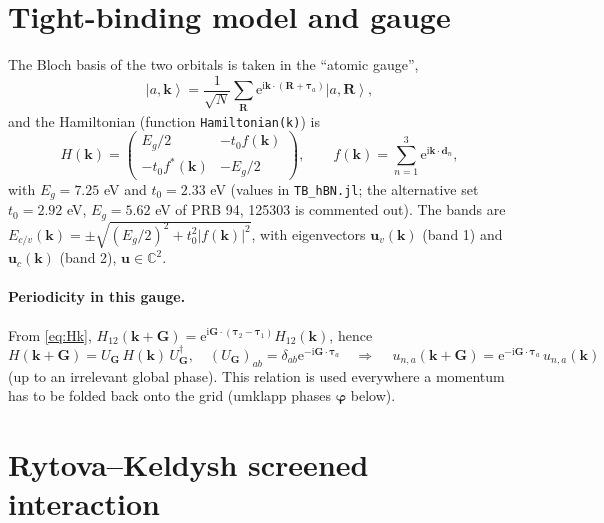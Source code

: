 \documentclass[11pt,a4paper]{article}
\newcommand{\ii}{\mathrm{i}}
\newcommand{\ee}{\mathrm{e}}
\newcommand{\kk}{\bm{k}}
\newcommand{\GG}{\bm{G}}
\newcommand{\RR}{\bm{R}}
\newcommand{\dd}{\bm{d}}
\newcommand{\ttau}{\bm{\tau}}
\newcommand{\ket}[1]{\left|#1\right\rangle}
\newcommand{\code}[1]{\texttt{#1}}
\begin{document}
\section{Tight-binding model and gauge}
\label{sec:tb}

The Bloch basis of the two orbitals is taken in the ``atomic gauge'',
\begin{equation}
\ket{a,\kk}=\frac{1}{\sqrt N}\sum_{\RR}\ee^{\ii\kk\cdot(\RR+\ttau_a)}\ket{a,\RR},
\end{equation}
and the Hamiltonian (function \code{Hamiltonian(k)}) is
\begin{equation}
H(\kk)=\begin{pmatrix}E_g/2 & -t_0 f(\kk)\\ -t_0 f^*(\kk) & -E_g/2\end{pmatrix},\qquad
f(\kk)=\sum_{n=1}^{3}\ee^{\ii\kk\cdot\dd_n},
\label{eq:Hk}
\end{equation}
with $E_g=7.25$ eV and $t_0=2.33$ eV (values in \code{TB\_hBN.jl}; the alternative set $t_0=2.92$ eV, $E_g=5.62$ eV of PRB 94, 125303 is commented out). The bands are $E_{c/v}(\kk)=\pm\sqrt{(E_g/2)^2+t_0^2|f(\kk)|^2}$, with eigenvectors
$\bm u_v(\kk)$ (band 1) and $\bm u_c(\kk)$ (band 2), $\bm u\in\mathbb C^2$.

\paragraph{Periodicity in this gauge.} From \eqref{eq:Hk}, $H_{12}(\kk+\GG)=\ee^{\ii\GG\cdot(\ttau_2-\ttau_1)}H_{12}(\kk)$, hence
\begin{equation}
H(\kk+\GG)=U_{\GG}\,H(\kk)\,U_{\GG}^\dagger,\quad (U_{\GG})_{ab}=\delta_{ab}\ee^{-\ii\GG\cdot\ttau_a}
\quad\Longrightarrow\quad
\boxed{\,u_{n,a}(\kk+\GG)=\ee^{-\ii\GG\cdot\ttau_a}\,u_{n,a}(\kk)\,}
\label{eq:gaugeG}
\end{equation}
(up to an irrelevant global phase). This relation is used everywhere a momentum has to be folded back onto the grid (umklapp phases $\bm\varphi$ below).

\section{Rytova--Keldysh screened interaction}
\label{sec:RK}
\end{document}
